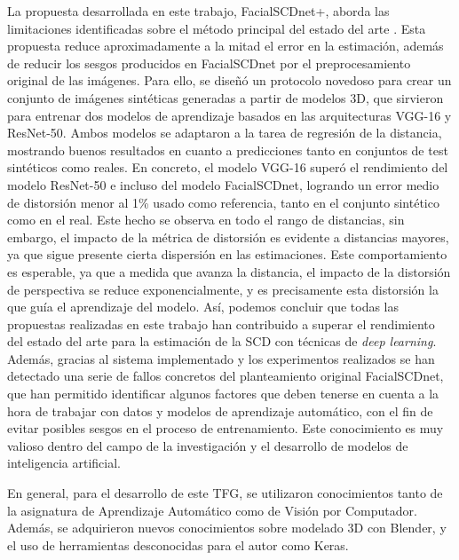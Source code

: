 La propuesta desarrollada en este trabajo, FacialSCDnet+, aborda las limitaciones identificadas sobre el método principal del estado del arte \cite{14}. Esta propuesta reduce aproximadamente a la mitad el error en la estimación, además de reducir los sesgos producidos en FacialSCDnet por el preprocesamiento original de las imágenes. Para ello, se diseñó un protocolo novedoso para crear un conjunto de imágenes sintéticas generadas a partir de modelos 3D, que sirvieron para entrenar dos modelos de aprendizaje basados en las arquitecturas VGG-16 y ResNet-50. Ambos modelos se adaptaron a la tarea de regresión de la distancia, mostrando buenos resultados en cuanto a predicciones tanto en conjuntos de test sintéticos como reales. En concreto, el modelo VGG-16 superó el rendimiento del modelo ResNet-50 e incluso del modelo FacialSCDnet, logrando un error medio de distorsión menor al 1\% usado como referencia, tanto en el conjunto sintético como en el real. Este hecho se observa en todo el rango de distancias, sin embargo, el impacto de la métrica de distorsión es evidente a distancias mayores, ya que sigue presente cierta dispersión en las estimaciones. Este comportamiento es esperable, ya que a medida que avanza la distancia, el impacto de la distorsión de perspectiva se reduce exponencialmente, y es precisamente esta distorsión la que guía el aprendizaje del modelo. Así, podemos concluir que todas las propuestas realizadas en este trabajo han contribuido a superar el rendimiento del estado del arte para la estimación de la SCD con técnicas de \textit{deep learning}. Además, gracias al sistema implementado y los experimentos realizados se han detectado una serie de fallos concretos del planteamiento original FacialSCDnet, que han permitido identificar algunos factores que deben tenerse en cuenta a la hora de trabajar con datos y modelos de aprendizaje automático, con el fin de evitar posibles sesgos en el proceso de entrenamiento. Este conocimiento es muy valioso dentro del campo de la investigación y el desarrollo de modelos de inteligencia artificial.

En general, para el desarrollo de este TFG, se utilizaron conocimientos tanto de la asignatura de Aprendizaje Automático como de Visión por Computador. Además, se adquirieron nuevos conocimientos sobre modelado 3D con Blender, y el uso de herramientas desconocidas para el autor como Keras.

